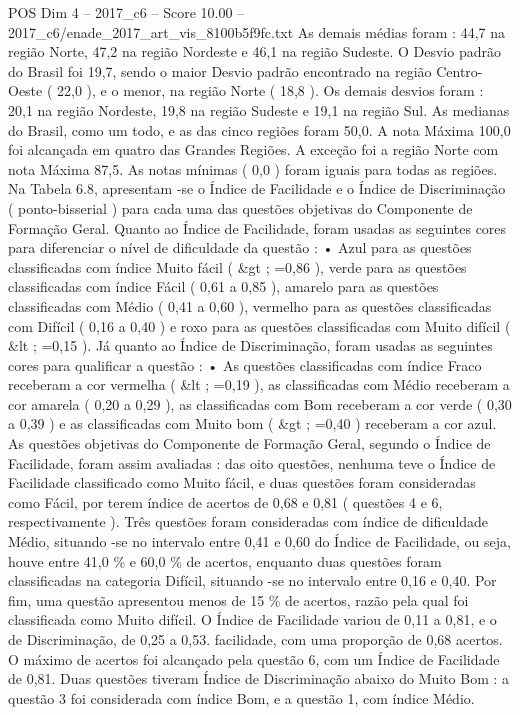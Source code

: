 \begin{textsample}{POS Dim 4 – 2017\_c6 – Score 10.00 – 2017\_c6/enade\_2017\_art\_vis\_8100b5f9fc.txt}
As demais médias foram : 44,7 na região Norte, 47,2 na região Nordeste e 46,1 na região Sudeste.
O Desvio padrão do Brasil foi 19,7, sendo o maior Desvio padrão encontrado na região Centro-Oeste ( 22,0 ), e o menor, na região Norte ( 18,8 ).
Os demais desvios foram : 20,1 na região Nordeste, 19,8 na região Sudeste e 19,1 na região Sul.
As medianas do Brasil, como um todo, e as das cinco regiões foram 50,0.
A nota Máxima 100,0 foi alcançada em quatro das Grandes Regiões.
A exceção foi a região Norte com nota Máxima 87,5.
As notas mínimas ( 0,0 ) foram iguais para todas as regiões.
Na Tabela 6.8, apresentam -se o Índice de Facilidade e o Índice de Discriminação ( ponto-bisserial ) para cada uma das questões objetivas do Componente de Formação Geral.
Quanto ao Índice de Facilidade, foram usadas as seguintes cores para diferenciar o nível de dificuldade da questão : • Azul para as questões classificadas com índice Muito fácil ( \&gt ; =0,86 ), verde para as questões classificadas com índice Fácil ( 0,61 a 0,85 ), amarelo para as questões classificadas com Médio ( 0,41 a 0,60 ), vermelho para as questões classificadas com Difícil ( 0,16 a 0,40 ) e roxo para as questões classificadas com Muito difícil ( \&lt ; =0,15 ).
Já quanto ao Índice de Discriminação, foram usadas as seguintes cores para qualificar a questão : • As questões classificadas com índice Fraco receberam a cor vermelha ( \&lt ; =0,19 ), as classificadas com Médio receberam a cor amarela ( 0,20 a 0,29 ), as classificadas com Bom receberam a cor verde ( 0,30 a 0,39 ) e as classificadas com Muito bom ( \&gt ; =0,40 ) receberam a cor azul.
As questões objetivas do Componente de Formação Geral, segundo o Índice de Facilidade, foram assim avaliadas : das oito questões, nenhuma teve o Índice de Facilidade classificado como Muito fácil, e duas questões foram consideradas como Fácil, por terem índice de acertos de 0,68 e 0,81 ( questões 4 e 6, respectivamente ).
Três questões foram consideradas com índice de dificuldade Médio, situando -se no intervalo entre 0,41 e 0,60 do Índice de Facilidade, ou seja, houve entre 41,0 \% e 60,0 \% de acertos, enquanto duas questões foram classificadas na categoria Difícil, situando -se no intervalo entre 0,16 e 0,40.
Por fim, uma questão apresentou menos de 15 \% de acertos, razão pela qual foi classificada como Muito difícil.
O Índice de Facilidade variou de 0,11 a 0,81, e o de Discriminação, de 0,25 a 0,53. facilidade, com uma proporção de 0,68 acertos.
O máximo de acertos foi alcançado pela questão 6, com um Índice de Facilidade de 0,81.
Duas questões tiveram Índice de Discriminação abaixo do Muito Bom : a questão 3 foi considerada com índice Bom, e a questão 1, com índice Médio.

\end{textsample}
